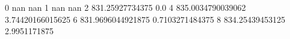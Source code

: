0 nan nan
1 nan nan
2 831.25927734375 0.0
4 835.0034790039062 3.74420166015625
6 831.9696044921875 0.7103271484375
8 834.25439453125 2.9951171875
